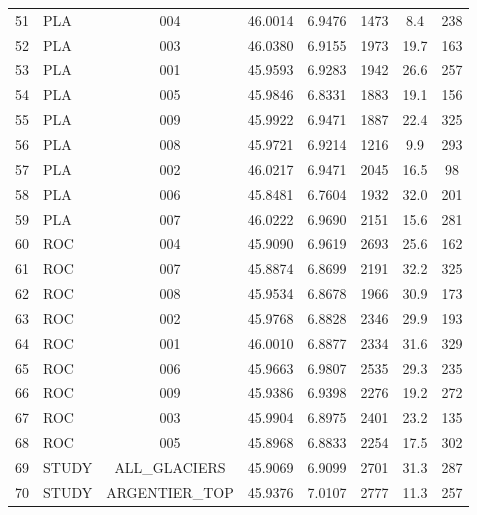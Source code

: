 \begin{table}[htbp]
\begin{tabular}{|l|l|c|c|c|c|c|c|}
51 & PLA & 004 & 46.0014 & 6.9476 & 1473 & 8.4 & 238 \\
52 & PLA & 003 & 46.0380 & 6.9155 & 1973 & 19.7 & 163 \\
53 & PLA & 001 & 45.9593 & 6.9283 & 1942 & 26.6 & 257 \\
54 & PLA & 005 & 45.9846 & 6.8331 & 1883 & 19.1 & 156 \\
55 & PLA & 009 & 45.9922 & 6.9471 & 1887 & 22.4 & 325 \\
56 & PLA & 008 & 45.9721 & 6.9214 & 1216 & 9.9 & 293 \\
57 & PLA & 002 & 46.0217 & 6.9471 & 2045 & 16.5 & 98 \\
58 & PLA & 006 & 45.8481 & 6.7604 & 1932 & 32.0 & 201 \\
59 & PLA & 007 & 46.0222 & 6.9690 & 2151 & 15.6 & 281 \\
60 & ROC & 004 & 45.9090 & 6.9619 & 2693 & 25.6 & 162 \\
61 & ROC & 007 & 45.8874 & 6.8699 & 2191 & 32.2 & 325 \\
62 & ROC & 008 & 45.9534 & 6.8678 & 1966 & 30.9 & 173 \\
63 & ROC & 002 & 45.9768 & 6.8828 & 2346 & 29.9 & 193 \\
64 & ROC & 001 & 46.0010 & 6.8877 & 2334 & 31.6 & 329 \\
65 & ROC & 006 & 45.9663 & 6.9807 & 2535 & 29.3 & 235 \\
66 & ROC & 009 & 45.9386 & 6.9398 & 2276 & 19.2 & 272 \\
67 & ROC & 003 & 45.9904 & 6.8975 & 2401 & 23.2 & 135 \\
68 & ROC & 005 & 45.8968 & 6.8833 & 2254 & 17.5 & 302 \\
69 & STUDY & ALL_GLACIERS & 45.9069 & 6.9099 & 2701 & 31.3 & 287 \\
70 & STUDY & ARGENTIER_TOP & 45.9376 & 7.0107 & 2777 & 11.3 & 257 \\

\hline
\end{tabular}
\end{table}
